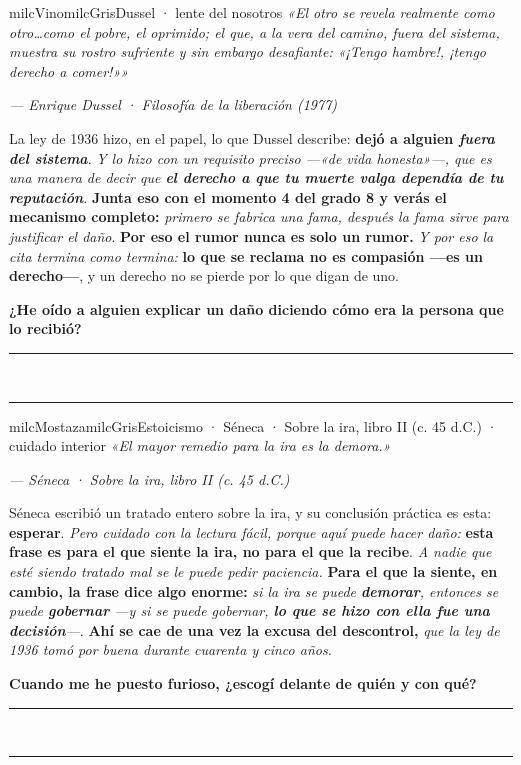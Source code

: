 \documentclass[11pt,letterpaper]{article}
\newcommand{\linead}[1]{\noindent\color{milcLinea}\rule{#1}{0.5pt}\color{milcNegro}}
\begin{document}
\begin{softbox}{milcVino}{milcGris}{Dussel · lente del nosotros}
\textit{«El otro se revela realmente como otro\ldots como el pobre, el oprimido; el que, a la vera del camino, fuera del sistema, muestra su rostro sufriente y sin embargo desafiante: «¡Tengo hambre!, ¡tengo derecho a comer!»»}

{\footnotesize\itshape\color{milcNegro!70}--- Enrique Dussel · Filosofía de la liberación (1977)}

La ley de 1936 hizo, en el papel, lo que Dussel describe: \textbf{dejó a alguien \emph{fuera del sistema}}. \emph{Y lo hizo con un requisito preciso ---«de vida honesta»---, que es una manera de decir que \textbf{el derecho a que tu muerte valga dependía de tu reputación}.} \textbf{Junta eso con el momento 4 del grado 8 y verás el mecanismo completo:} \emph{primero se fabrica una fama, después la fama sirve para justificar el daño}. \textbf{Por eso el rumor nunca es solo un rumor.} \emph{Y por eso la cita termina como termina:} \textbf{lo que se reclama no es compasión ---es un derecho---}, y un derecho no se pierde por lo que digan de uno.

\textbf{¿He oído a alguien explicar un daño diciendo cómo era la persona que lo recibió?}
\end{softbox}
\linead{\linewidth}\\[1mm]
\linead{\linewidth}

\begin{softbox}{milcMostaza}{milcGris}{Estoicismo · Séneca · Sobre la ira, libro II (c. 45 d.C.) · cuidado interior}
\textit{«El mayor remedio para la ira es la demora.»}

{\footnotesize\itshape\color{milcNegro!70}--- Séneca · Sobre la ira, libro II (c. 45 d.C.)}

Séneca escribió un tratado entero sobre la ira, y su conclusión práctica es esta: \textbf{esperar}. \emph{Pero cuidado con la lectura fácil, porque aquí puede hacer daño:} \textbf{esta frase es para el que siente la ira, \textbf{no} para el que la recibe}. \emph{A nadie que esté siendo tratado mal se le puede pedir paciencia.} \textbf{Para el que la siente, en cambio, la frase dice algo enorme:} \emph{si la ira se puede \textbf{demorar}, entonces se puede \textbf{gobernar} ---y si se puede gobernar, \textbf{lo que se hizo con ella fue una decisión}---}. \textbf{Ahí se cae de una vez la excusa del descontrol,} \emph{que la ley de 1936 tomó por buena durante cuarenta y cinco años.}

\textbf{Cuando me he puesto furioso, ¿escogí delante de quién y con qué?}
\end{softbox}
\linead{\linewidth}\\[1mm]
\linead{\linewidth}
\end{document}
